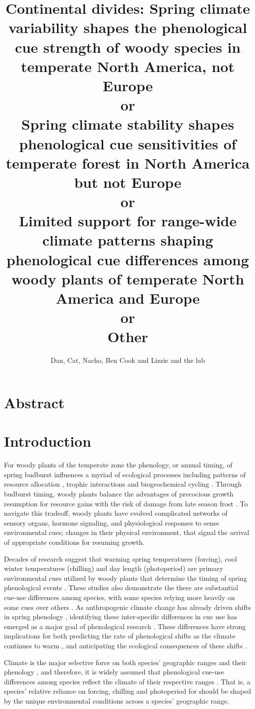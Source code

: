 \documentclass[12pt]{article}\usepackage[]{graphicx}\usepackage[]{color}
\title{Continental divides: Spring climate variability shapes the phenological cue strength of woody species in temperate North America, not Europe\\ or\\
Spring climate stability shapes phenological cue sensitivities of temperate forest in North America but not Europe\\ or\\
Limited support for range-wide climate patterns shaping phenological cue differences among woody plants of temperate North America and Europe \\or\\
Other
}
\author{Dan, Cat, Nacho, Ben Cook and Lizzie and the lab}
\begin{document}
\maketitle

\section*{Abstract}
\section*{Introduction}
For woody plants of the temperate zone the phenology, or annual timing, of spring budburst influences a myriad of ecological processes including patterns of resource allocation \citep{Seiwa:1991vr}, trophic interactions \citep{Memmott2007} and biogeochemical cycling \citep{Piao2007}.
 Through budburst timing, woody plants balance the advantages of precocious growth resumption for resource gains with the risk of damage from late season frost \citep{Savage:2013aa}. To navigate this tradeoff, woody plants have evolved complicated networks of sensory organs, hormone signaling, and physiological responses to sense environmental cues; changes in their physical environment, that signal the arrival of appropriate conditions for resuming growth.

Decades of research suggest that warming spring temperatures (forcing), cool winter temperatures (chilling) and day length (photoperiod) are primary environmental cues utilized by woody plants that determine the timing of spring phenological events \cite{Ettinger:2020aa,Forrest2010}. These studies also demonstrate the there are substantial cue-use differences among species, with some species relying more heavily on some cues over others \citep{Laube:2014aa}. As anthropogenic climate change has already driven shifts in spring phenology \citep{Menzel2006}, identifying these inter-specific differences in cue use has emerged as a major goal of phenological research \citep{}. These differences have strong implications for both predicting the rate of phenological shifts as the climate continues to warm \citep{}, and anticipating the ecological consequences of these shifts \citep{}.

Climate is the major selective force on both species' geographic ranges \citep{Morin:2011aa} and their phenology \citep{Savage:2013aa}, and therefore, it is widely assumed that phenological cue-use differences among species reflect the climate of their respective ranges \citep{Zohner:2017aa,Silvestro:2019wa}. That is, a species' relative reliance on forcing, chilling and photoperiod for should be shaped by the unique environmental conditions across a species' geographic range.
\end{document}
